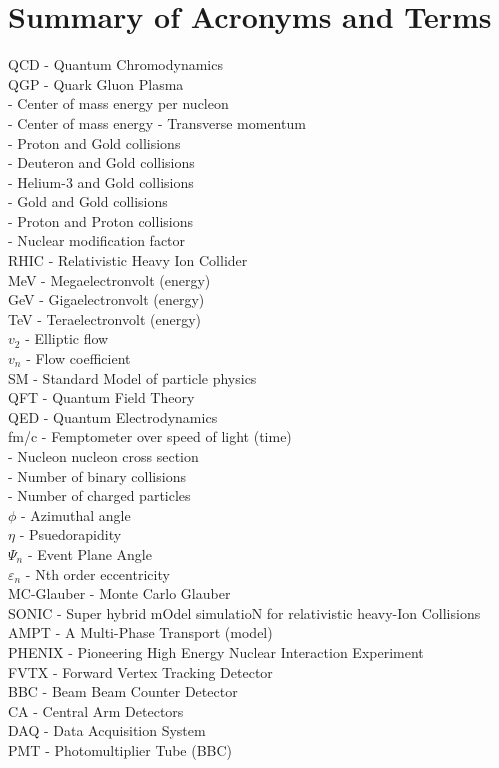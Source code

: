 \chapter{Summary of Acronyms and Terms}	\OnePageChapter         %
\noindent
QCD - Quantum Chromodynamics\\
QGP - Quark Gluon Plasma\\
\sqsn - Center of mass energy per nucleon\\
\sqs - Center of mass energy
\pt  - Transverse momentum\\
\pau  - Proton and Gold collisions\\
\dau  - Deuteron and Gold collisions\\
\hau  - Helium-3 and Gold collisions\\
\auau  - Gold and Gold collisions\\
\pp  - Proton and Proton collisions\\
\raa  - Nuclear modification factor\\
RHIC - Relativistic Heavy Ion Collider\\
MeV - Megaelectronvolt (energy)\\
GeV - Gigaelectronvolt (energy)\\
TeV - Teraelectronvolt (energy)\\
$v_2$ - Elliptic flow\\
$v_n$ - Flow coefficient\\
SM - Standard Model of particle physics\\
QFT - Quantum Field Theory\\
QED - Quantum Electrodynamics\\
fm/c - Femptometer over speed of light (time)\\
\signn - Nucleon nucleon cross section\\
\Ncoll - Number of binary collisions\\
\Nch - Number of charged particles\\
$\phi$ - Azimuthal angle\\
$\eta$ - Psuedorapidity\\
$\Psi_n$ - Event Plane Angle\\
$\varepsilon_n$ - Nth order eccentricity\\
MC-Glauber - Monte Carlo Glauber\\
SONIC - Super hybrid mOdel simulatioN for relativistic heavy-Ion Collisions\\
AMPT - A Multi-Phase Transport (model)\\
PHENIX - Pioneering High Energy Nuclear Interaction Experiment\\
FVTX - Forward Vertex Tracking Detector\\
BBC - Beam Beam Counter Detector\\
CA - Central Arm Detectors\\
DAQ - Data Acquisition System\\
PMT - Photomultiplier Tube (BBC)
